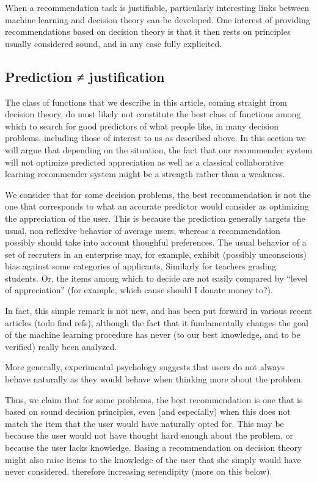 \documentclass[version=last, pagesize, twoside=off, bibliography=totoc, DIV=calc, fontsize=14pt, a4paper, french, english]{scrartcl}
\begin{document}
When a recommendation task is justifiable, particularly interesting links between machine learning and decision theory can be developed. 
One interest of providing recommendations based on decision theory is that it then rests on principles usually considered sound, and in any case fully explicited.

\subsection{Prediction ≠ justification}
The class of functions that we describe in this article, coming straight from decision theory, do most likely not constitute the best class of functions among which to search for good predictors of what people like, in many decision problems, including those of interest to us as described above.
In this section we will argue that depending on the situation, the fact that our recommender system will not optimize predicted appreciation as well as a classical collaborative learning recommender system might be a strength rather than a weakness.

We consider that for some decision problems, the best recommendation is not the one that corresponds to what an accurate predictor would consider as optimizing the appreciation of the user. This is because the prediction generally targets the usual, non reflexive behavior of average users, whereas a recommendation possibly should take into account thoughful preferences. The usual behavior of a set of recruters in an enterprise may, for example, exhibit (possibly unconscious) bias against some categories of applicants. Similarly for teachers grading students. Or, the items among which to decide are not easily compared by “level of appreciation” (for example, which cause should I donate money to?).

In fact, this simple remark is not new, and has been put forward in various recent articles (todo find refs), although the fact that it fundamentally changes the goal of the machine learning procedure has never (to our best knowledge, and to be verified) really been analyzed.

More generally, experimental psychology suggests that users do not always behave naturally as they would behave when thinking more about the problem.

Thus, we claim that for some problems, the best recommendation is one that is based on sound decision principles, even (and especially) when this does not match the item that the user would have naturally opted for. This may be because the user would not have thought hard enough about the problem, or because the user lacks knowledge. Basing a recommendation on decision theory might also raise items to the knowledge of the user that she simply would have never considered, therefore increasing serendipity (more on this below).
\end{document}
